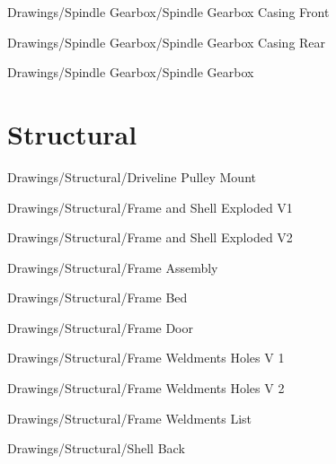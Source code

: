 
{Drawings/Spindle Gearbox/Spindle Gearbox Casing Front}


{Drawings/Spindle Gearbox/Spindle Gearbox Casing Rear}


{Drawings/Spindle Gearbox/Spindle Gearbox}

\section{Structural}


{Drawings/Structural/Driveline Pulley Mount}


{Drawings/Structural/Frame and Shell Exploded V1}


{Drawings/Structural/Frame and Shell Exploded V2}


{Drawings/Structural/Frame Assembly}


{Drawings/Structural/Frame Bed}


{Drawings/Structural/Frame Door}


{Drawings/Structural/Frame Weldments Holes V 1}


{Drawings/Structural/Frame Weldments Holes V 2}


{Drawings/Structural/Frame Weldments List}


{Drawings/Structural/Shell Back}


